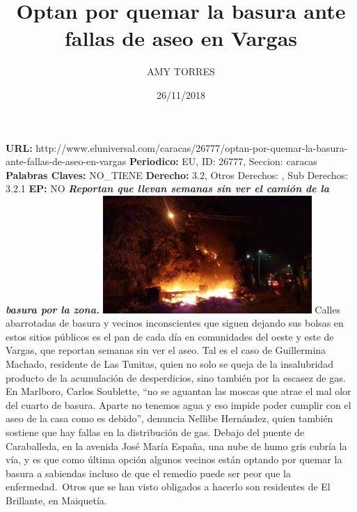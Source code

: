 \documentclass{article}%
\title{\textbf{Optan por quemar la basura ante fallas de aseo en Vargas}}%
\author{AMY TORRES}%
\date{26/11/2018}%
\begin{document}
%
\normalsize%
\maketitle%
\textbf{URL: }%
http://www.eluniversal.com/caracas/26777/optan{-}por{-}quemar{-}la{-}basura{-}ante{-}fallas{-}de{-}aseo{-}en{-}vargas\newline%
%
\textbf{Periodico: }%
EU, %
ID: %
26777, %
Seccion: %
caracas\newline%
%
\textbf{Palabras Claves: }%
NO\_TIENE\newline%
%
\textbf{Derecho: }%
3.2, %
Otros Derechos: %
, %
Sub Derechos: %
3.2.1\newline%
%
\textbf{EP: }%
NO\newline%
\newline%
%
\textbf{\textit{Reportan que llevan semanas sin ver el camión de la basura por la zona.}}%
\newline%
\newline%
%
\includegraphics[width=300px]{252.jpg}%
\newline%
%
Calles abarrotadas de basura y vecinos inconscientes que siguen dejando sus bolsas en estos sitios públicos es el pan de cada día en comunidades del oeste y este de Vargas, que reportan semanas sin ver el aseo.%
\newline%
%
Tal es el caso de Guillermina Machado, residente de Las Tunitas, quien no solo se queja de la insalubridad producto de la acumulación de desperdicios, sino también por la escasez de gas.%
\newline%
%
En Marlboro, Carlos Soublette, “no se aguantan las moscas que atrae el mal olor del cuarto de basura. Aparte no tenemos agua y eso impide poder cumplir con el aseo de la casa como es debido”, denuncia Nellibe Hernández, quien también sostiene que hay fallas en la distribución de gas.%
\newline%
%
Debajo del puente de Caraballeda, en la avenida José María España, una nube de humo gris cubría la vía, y es que como última opción algunos vecinos están optando por quemar la basura a sabiendas incluso de que el remedio puede ser peor que la enfermedad.~Otros que se han visto obligados a hacerlo son residentes de El Brillante, en Maiquetía.%
\end{document}
